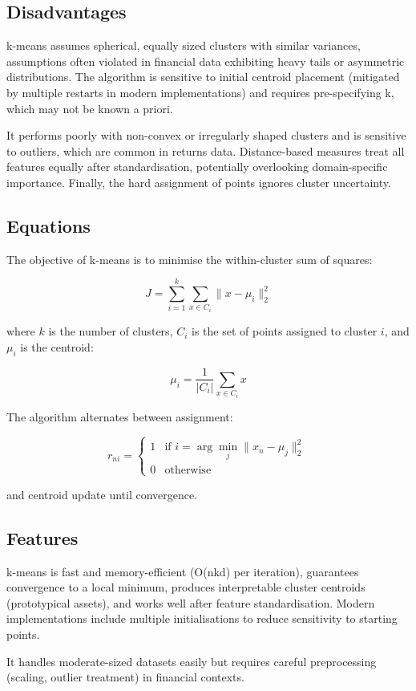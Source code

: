 \documentclass[11pt,a4paper]{article}
\begin{document}
\subsection{Disadvantages}
k-means assumes spherical, equally sized clusters with similar variances, assumptions often violated in financial data exhibiting heavy tails or asymmetric distributions. The algorithm is sensitive to initial centroid placement (mitigated by multiple restarts in modern implementations) and requires pre-specifying k, which may not be known a priori.

It performs poorly with non-convex or irregularly shaped clusters and is sensitive to outliers, which are common in returns data. Distance-based measures treat all features equally after standardisation, potentially overlooking domain-specific importance. Finally, the hard assignment of points ignores cluster uncertainty.

\subsection{Equations}
The objective of k-means is to minimise the within-cluster sum of squares:

\[
J = \sum_{i=1}^{k} \sum_{x \in C_i} \| x - \mu_i \|^2_2
\]

where \( k \) is the number of clusters, \( C_i \) is the set of points assigned to cluster \( i \), and \( \mu_i \) is the centroid:

\[
\mu_i = \frac{1}{|C_i|} \sum_{x \in C_i} x
\]

The algorithm alternates between assignment:

\[
r_{ni} = 
\begin{cases} 
1 & \text{if } i = \arg\min_j \| x_n - \mu_j \|^2_2 \\
0 & \text{otherwise}
\end{cases}
\]

and centroid update until convergence.

\subsection{Features}
k-means is fast and memory-efficient (O(nkd) per iteration), guarantees convergence to a local minimum, produces interpretable cluster centroids (prototypical assets), and works well after feature standardisation. Modern implementations include multiple initialisations to reduce sensitivity to starting points.

It handles moderate-sized datasets easily but requires careful preprocessing (scaling, outlier treatment) in financial contexts.
\end{document}
